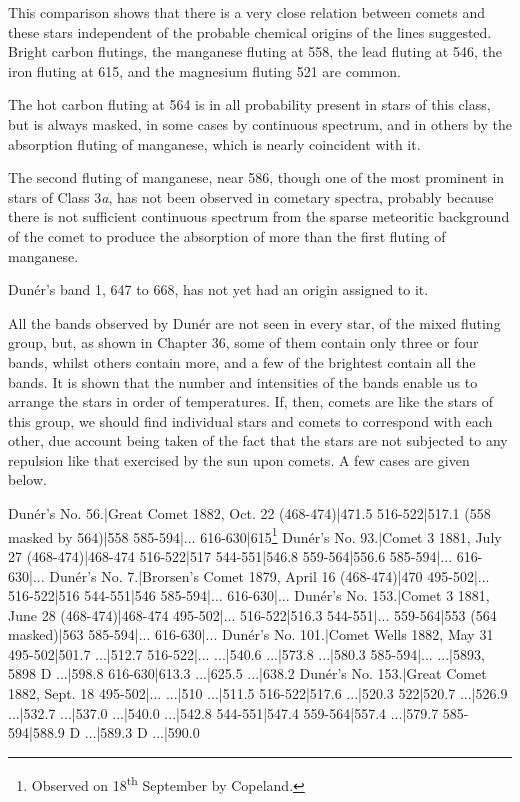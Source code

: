 \documentclass[a4paper, 12pt, oneside, polutonikogreek, english]{article}
\begin{document}
This comparison shows that there is a very close relation between comets and these stars independent of the probable chemical origins of the lines suggested. Bright carbon flutings, the manganese fluting at 558, the lead fluting at 546, the iron fluting at 615, and the magnesium fluting 521 are common.

The hot carbon fluting at 564 is in all probability present in stars of this class, but is always masked, in some cases by continuous spectrum, and in others by the absorption fluting of manganese, which is nearly coincident with it.

The second fluting of manganese, near 586, though one of the most prominent in stars of Class 3\emph{a}, has not been observed in cometary spectra, probably because there is not sufficient continuous spectrum from the sparse meteoritic background of the comet to produce the absorption of more than the first fluting of manganese.

Dunér's band 1, 647 to 668, has not yet had an origin assigned to it.

All the bands observed by Dunér are not seen in every star, of the mixed fluting group, but, as shown in Chapter 36, some of them contain only three or four bands, whilst others contain more, and a few of the brightest contain all the bands. It is shown that the number and intensities of the bands enable us to arrange the stars in order of temperatures. If, then, comets are like the stars of this group, we should find individual stars and comets to correspond with each other, due account being taken of the fact that the stars are not subjected to any repulsion like that exercised by the sun upon comets. A few cases are given below.

Dunér's No. 56.|Great Comet 1882, Oct. 22 
(468-474)|471.5 
516-522|517.1 
(558 masked by 564)|558 
585-594|... 
616-630|615\footnote{Observed on 18\textsuperscript{th} September by Copeland.} 
Dunér's No. 93.|Comet 3 1881, July 27 
(468-474)|468-474 
516-522|517 
544-551|546.8 
559-564|556.6 
585-594|... 
616-630|... 
Dunér's No. 7.|Brorsen's Comet 1879, April 16 
(468-474)|470 
495-502|... 
516-522|516 
544-551|546 
585-594|... 
616-630|... 
Dunér's No. 153.|Comet 3 1881, June 28 
(468-474)|468-474 
495-502|... 
516-522|516.3 
544-551|... 
559-564|553 
(564 masked)|563 
585-594|... 
616-630|... 
Dunér's No. 101.|Comet Wells 1882, May 31 
495-502|501.7 
...|512.7 
516-522|... 
...|540.6 
...|573.8 
...|580.3 
585-594|... 
...|{5893, 5898} D 
...|598.8 
616-630|613.3 
...|625.5 
...|638.2 
Dunér's No. 153.|Great Comet 1882, Sept. 18 
495-502|... 
...|510 
...|511.5 
516-522|517.6 
...|520.3 
522|520.7 
...|526.9 
...|532.7 
...|537.0 
...|540.0 
...|542.8 
544-551|547.4 
559-564|557.4 
...|579.7 
585-594|588.9 D 
...|589.3 D 
...|590.0 
\end{document}
